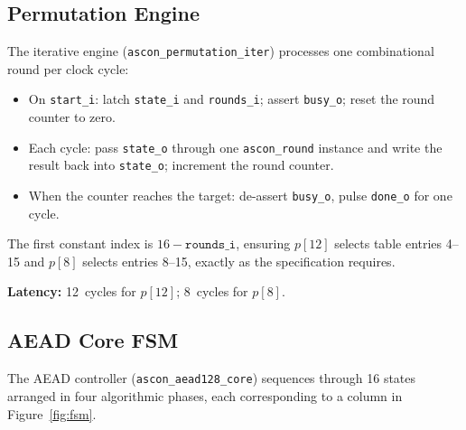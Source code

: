 \documentclass[11pt,a4paper]{article}
\begin{document}
\subsection{Permutation Engine}

The iterative engine (\texttt{ascon\_permutation\_iter}) processes one
combinational round per clock cycle:

\begin{itemize}
  \item On \texttt{start\_i}: latch \texttt{state\_i} and \texttt{rounds\_i};
        assert \texttt{busy\_o}; reset the round counter to zero.
  \item Each cycle: pass \texttt{state\_o} through one \texttt{ascon\_round}
        instance and write the result back into \texttt{state\_o};
        increment the round counter.
  \item When the counter reaches the target: de-assert \texttt{busy\_o},
        pulse \texttt{done\_o} for one cycle.
\end{itemize}

The first constant index is $16 - \texttt{rounds\_i}$, ensuring $p[12]$
selects table entries 4--15 and $p[8]$ selects entries 8--15, exactly as
the specification requires.

\textbf{Latency:} 12~cycles for $p[12]$; 8~cycles for $p[8]$.

\subsection{AEAD Core FSM}
\label{sec:fsm}

The AEAD controller (\texttt{ascon\_aead128\_core}) sequences through 16
states arranged in four algorithmic phases, each corresponding to a column
in Figure~\ref{fig:fsm}.
\end{document}
